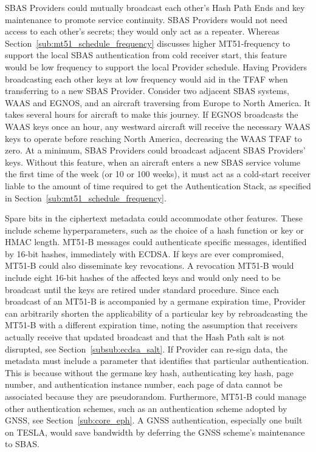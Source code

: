 \documentclass[letterpaper,times]{IONconf/IONconf}
\begin{document}
		SBAS Providers could mutually broadcast each other's Hash Path Ends and key maintenance to promote service continuity.
		SBAS Providers would not need access to each other's secrets; they would only act as a repeater.
		Whereas Section~\ref{sub:mt51_schedule_frequency} discusses higher MT51-frequency to support the local SBAS authentication from cold receiver start, this feature would be low frequency to support the local Provider schedule.
		Having Providers broadcasting each other keys at low frequency would aid in the TFAF when transferring to a new SBAS Provider.
		Consider two adjacent SBAS systems, WAAS and EGNOS, and an aircraft traversing from Europe to North America.
		It takes several hours for aircraft to make this journey.
		If EGNOS broadcasts the WAAS keys once an hour, any westward aircraft will receive the necessary WAAS keys to operate before reaching North America, decreasing the WAAS TFAF to zero. 
		At a minimum, SBAS Providers could broadcast adjacent SBAS Providers' keys.
		Without this feature, when an aircraft enters a new SBAS service volume the first time of the week (or 10 or 100 weeks), it must act as a cold-start receiver liable to the amount of time required to get the Authentication Stack, as specified in Section~\ref{sub:mt51_schedule_frequency}.

		Spare bits in the ciphertext metadata could accommodate other features.
		These include scheme hyperparameters, such as the choice of a hash function or key or HMAC length.
		MT51-B messages could authenticate specific messages, identified by 16-bit hashes, immediately with ECDSA.
		If keys are ever compromised, MT51-B could also disseminate key revocations.
		A revocation MT51-B would include eight 16-bit hashes of the affected keys and would only need to be broadcast until the keys are retired under standard procedure.
		Since each broadcast of an MT51-B is accompanied by a germane expiration time, Provider can arbitrarily shorten the applicability of a particular key by rebroadcasting the MT51-B with a different expiration time, noting the assumption that receivers actually receive that updated broadcast and that the Hash Path salt is not disrupted, see Section~\ref{subsub:ecdsa_salt}. 
		If Provider can re-sign data, the metadata must include a parameter that identifies that particular authentication.
		This is because without the germane key hash, authenticating key hash, page number, and authentication instance number, each page of data cannot be associated because they are pseudorandom.
		Furthermore, MT51-B could manage other authentication schemes, such as an authentication scheme adopted by GNSS, see Section~\ref{sub:core_eph}.
		A GNSS authentication, especially one built on TESLA, would save bandwidth by deferring the GNSS scheme's maintenance to SBAS.
\end{document}
